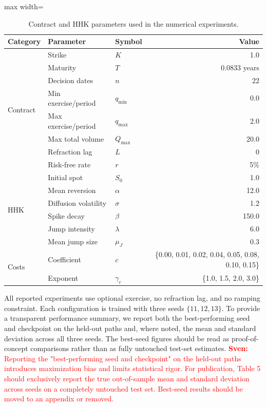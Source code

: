 \documentclass[a4paper,fleqn]{cas-dc}
\begin{document}
\begin{table}[htbp]
\centering
\caption{Contract and HHK parameters used in the numerical experiments.}
\label{tab:contract_params}
\begin{adjustbox}{max width=\linewidth}
\begin{tabular}{lllr}
\toprule
Category & Parameter & Symbol & Value \\
\midrule
\multirow{8}{*}{Contract}
 & Strike & $K$ & 1.0 \\
 & Maturity & $T$ & 0.0833 years \\
 & Decision dates & $n$ & 22 \\
 & Min exercise/period & $q_{\min}$ & 0.0 \\
 & Max exercise/period & $q_{\max}$ & 2.0 \\
 & Max total volume & $Q_{\max}$ & 20.0 \\
 & Refraction lag & $L$ & 0 \\
 & Risk-free rate & $r$ & 5\% \\
\midrule
\multirow{6}{*}{HHK}
 & Initial spot & $S_0$ & 1.0 \\
 & Mean reversion & $\alpha$ & 12.0 \\
 & Diffusion volatility & $\sigma$ & 1.2 \\
 & Spike decay & $\beta$ & 150.0 \\
 & Jump intensity & $\lambda$ & 6.0 \\
 & Mean jump size & $\mu_J$ & 0.3 \\
\midrule
\multirow{2}{*}{Costs}
 & Coefficient & $c$ & \{0.00, 0.01, 0.02, 0.04, 0.05, 0.08, 0.10, 0.15\} \\
 & Exponent & $\gamma_c$ & \{1.0, 1.5, 2.0, 3.0\} \\
\bottomrule
\end{tabular}
\end{adjustbox}
\end{table}

All reported experiments use optional exercise, no refraction lag, and no ramping constraint. Each configuration is trained with three seeds $\{11,12,13\}$. To provide a transparent performance summary, we report both the best-performing seed and checkpoint on the held-out paths and, where noted, the mean and standard deviation across all three seeds. The best-seed figures should be read as proof-of-concept comparisons rather than as fully untouched test-set estimates. \textcolor{red}{\textbf{Sven:} Reporting the "best-performing seed and checkpoint" on the held-out paths introduces maximization bias and limits statistical rigor. For publication, Table 5 should exclusively report the true out-of-sample mean and standard deviation across seeds on a completely untouched test set. Best-seed results should be moved to an appendix or removed.}
\end{document}
